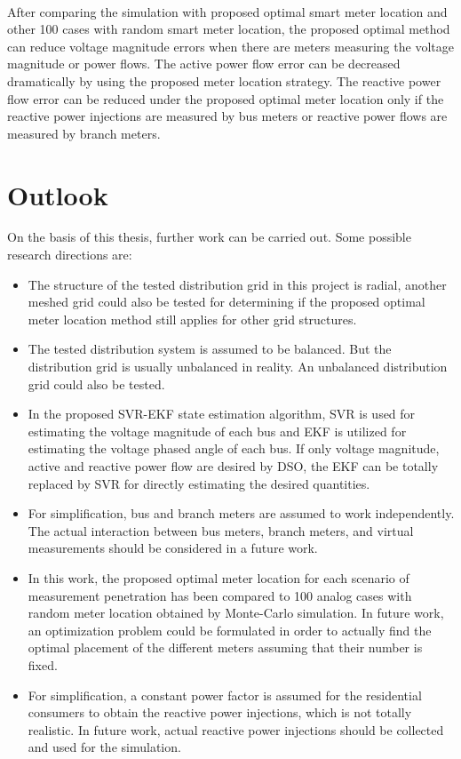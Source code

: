 \bigskip
\\After comparing the simulation with proposed optimal smart meter location and other 100 cases with random smart meter location, the proposed optimal method can reduce voltage magnitude errors when there are meters measuring the voltage magnitude or power flows. The active power flow error can be decreased dramatically by using the proposed meter location strategy. The reactive power flow error can be reduced under the proposed optimal meter location only if the reactive power injections are measured by bus meters or reactive power flows are measured by branch meters.



\section{Outlook}
On the basis of this thesis, further work can be carried out. Some possible research directions are:
\begin{itemize}
    \item The structure of the tested distribution grid in this project is radial, another meshed grid could also be tested for determining if the proposed optimal meter location method still applies for other grid structures.
    \item The tested distribution system is assumed to be balanced. But the distribution grid is usually unbalanced in reality. An unbalanced distribution grid could also be tested.
    \item In the proposed SVR-EKF state estimation algorithm, SVR is used for estimating the voltage magnitude of each bus and EKF is utilized for estimating the voltage phased angle of each bus. If only voltage magnitude, active and reactive power flow are desired by DSO, the EKF can be totally replaced by SVR for directly estimating the desired quantities.
    \item For simplification, bus and branch meters are assumed to work independently. The actual interaction between bus meters, branch meters, and virtual measurements should be considered in a future work.
    \item In this work, the proposed optimal meter location for each scenario of measurement penetration has been compared to 100 analog cases with random meter location obtained by Monte-Carlo simulation. In future work, an optimization problem could be formulated in order to actually find the optimal placement of the different meters assuming that their number is fixed.
    \item For simplification, a constant power factor is assumed for the residential consumers to obtain the reactive power injections, which is not totally realistic. In future work, actual reactive power injections should be collected and used for the simulation.

\end{itemize}





\newpage